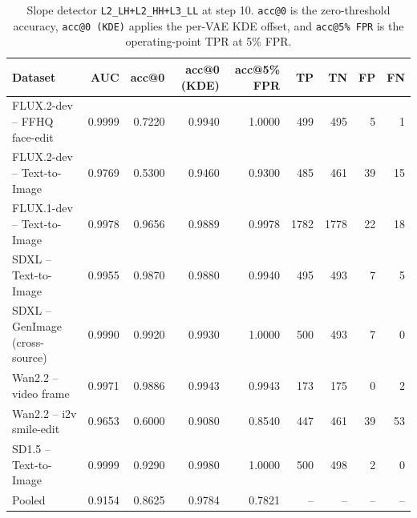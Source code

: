\begin{table}[t]
\centering
\small
\setlength{\tabcolsep}{5pt}
\begin{tabular}{lrrrrrrrr}
\toprule
Dataset & AUC & acc@0 & acc@0 (KDE) & acc@5\% FPR & TP & TN & FP & FN \\
\midrule
FLUX.2-dev -- FFHQ face-edit          & 0.9999 & 0.7220 & 0.9940 & 1.0000 & 499 & 495 & 5 & 1 \\
FLUX.2-dev -- Text-to-Image           & 0.9769 & 0.5300 & 0.9460 & 0.9300 & 485 & 461 & 39 & 15 \\
FLUX.1-dev -- Text-to-Image           & 0.9978 & 0.9656 & 0.9889 & 0.9978 & 1782 & 1778 & 22 & 18 \\
SDXL -- Text-to-Image                 & 0.9955 & 0.9870 & 0.9880 & 0.9940 & 495 & 493 & 7 & 5 \\
SDXL -- GenImage (cross-source)       & 0.9990 & 0.9920 & 0.9930 & 1.0000 & 500 & 493 & 7 & 0 \\
Wan2.2 -- video frame                 & 0.9971 & 0.9886 & 0.9943 & 0.9943 & 173 & 175 & 0 & 2 \\
Wan2.2 -- i2v smile-edit              & 0.9653 & 0.6000 & 0.9080 & 0.8540 & 447 & 461 & 39 & 53 \\
SD1.5 -- Text-to-Image                & 0.9999 & 0.9290 & 0.9980 & 1.0000 & 500 & 498 & 2 & 0 \\
\midrule
Pooled                                & 0.9154 & 0.8625 & 0.9784 & 0.7821 & -- & -- & -- & -- \\
\bottomrule
\end{tabular}
\caption{Slope detector \texttt{L2\_LH+L2\_HH+L3\_LL} at step 10. \texttt{acc@0} is the zero-threshold accuracy, \texttt{acc@0 (KDE)} applies the per-VAE KDE offset, and \texttt{acc@5\% FPR} is the operating-point TPR at 5\% FPR.}
\end{table}

